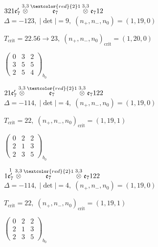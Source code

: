 \documentclass[10pt]{article}
\begin{document}
$321\mathfrak{e}_7'\overset{3,3}{\otimes}\overset{\textcolor{red}{2}1}{\mathfrak{e}_7}\overset{3,3}{\otimes}\mathfrak{e}_712$ \quad $\Delta=-123,\; |\det|=9,\; (n_+,n_-,n_0)=(1,19,0)$

\hspace{1em}$T_{\text{crit}}=22.56 \to 23,\; (n_+,n_-,n_0)_{\text{crit}}=(1,20,0)$

\hspace{2em}$\left(\begin{smallmatrix}0 & 3 & 2 \\ 3 & 5 & 5 \\ 2 & 5 & 4\end{smallmatrix}\right)_{\!b_0}$

\smallskip

$21\mathfrak{e}_7'\overset{3,3}{\otimes}\overset{\textcolor{red}{2}1}{\mathfrak{e}_7}\overset{3,3}{\otimes}\mathfrak{e}_7122$ \quad $\Delta=-114,\; |\det|=4,\; (n_+,n_-,n_0)=(1,19,0)$

\hspace{1em}$T_{\text{crit}}=22,\; (n_+,n_-,n_0)_{\text{crit}}=(1,19,1)$

\hspace{2em}$\left(\begin{smallmatrix}0 & 2 & 2 \\ 2 & 1 & 3 \\ 2 & 3 & 5\end{smallmatrix}\right)_{\!b_0}$

\smallskip

$1\overset{1}{\mathfrak{e}_7'}\overset{3,3}{\otimes}\overset{\textcolor{red}{2}1}{\mathfrak{e}_7}\overset{3,3}{\otimes}\mathfrak{e}_7122$ \quad $\Delta=-114,\; |\det|=4,\; (n_+,n_-,n_0)=(1,19,0)$

\hspace{1em}$T_{\text{crit}}=22,\; (n_+,n_-,n_0)_{\text{crit}}=(1,19,1)$

\hspace{2em}$\left(\begin{smallmatrix}0 & 2 & 2 \\ 2 & 1 & 3 \\ 2 & 3 & 5\end{smallmatrix}\right)_{\!b_0}$

\smallskip
\end{document}
